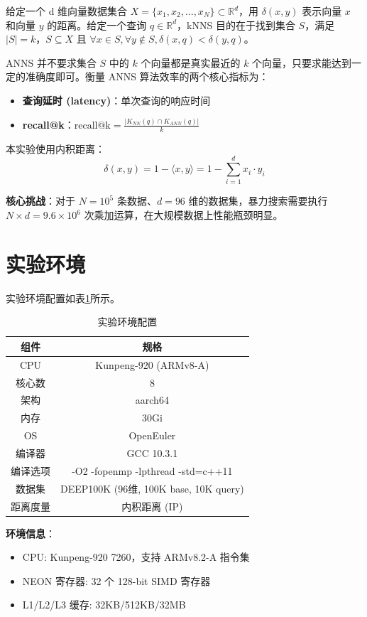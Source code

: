 \documentclass[a4paper]{article}
\begin{document}
给定一个 d 维向量数据集合 $X = \{x_1, x_2, \dots, x_N\} \subset \mathbb{R}^d$，用 $\delta(x, y)$ 表示向量 $x$ 和向量 $y$ 的距离。给定一个查询 $q \in \mathbb{R}^d$，kNNS 目的在于找到集合 $S$，满足 $|S| = k$，$S \subseteq X$ 且 $\forall x \in S, \forall y \notin S, \delta(x, q) < \delta(y, q)$。

ANNS 并不要求集合 $S$ 中的 $k$ 个向量都是真实最近的 $k$ 个向量，只要求能达到一定的准确度即可。衡量 ANNS 算法效率的两个核心指标为：

\begin{itemize}
  \item \textbf{查询延时 (latency)}：单次查询的响应时间
  \item \textbf{recall@k}：$\text{recall@k} = \frac{|K_{NN}(q) \cap K_{ANN}(q)|}{k}$
\end{itemize}

本实验使用内积距离：
$$\delta(x, y) = 1 - \langle x, y \rangle = 1 - \sum_{i=1}^{d} x_i \cdot y_i$$

\textbf{核心挑战}：对于 $N=10^5$ 条数据、$d=96$ 维的数据集，暴力搜索需要执行 $N \times d = 9.6 \times 10^6$ 次乘加运算，在大规模数据上性能瓶颈明显。

\section{实验环境}

实验环境配置如表\ref{table:env}所示。

\begin{table}[!htbp]
  \centering
  \begin{tabular}{cc}
  \toprule  
  \textbf{组件} & \textbf{规格} \\
  \midrule
  CPU & Kunpeng-920 (ARMv8-A) \\
  核心数 & 8 \\
  架构 & aarch64 \\
  内存 & 30Gi \\
  OS & OpenEuler \\
  编译器 & GCC 10.3.1 \\
  编译选项 & -O2 -fopenmp -lpthread -std=c++11 \\
  数据集 & DEEP100K (96维, 100K base, 10K query) \\
  距离度量 & 内积距离 (IP) \\
  \bottomrule
  \end{tabular}
  \caption{实验环境配置}
  \label{table:env}
\end{table}

\textbf{环境信息}：
\begin{itemize}
  \item CPU: Kunpeng-920 7260，支持 ARMv8.2-A 指令集
  \item NEON 寄存器: 32 个 128-bit SIMD 寄存器
  \item L1/L2/L3 缓存: 32KB/512KB/32MB
\end{itemize}
\end{document}
